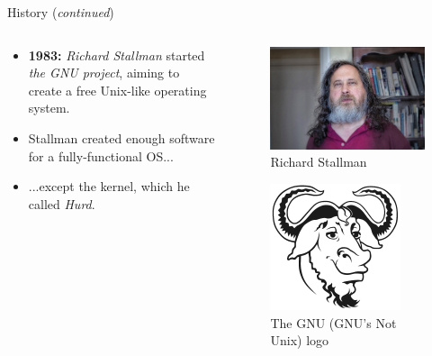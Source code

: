\documentclass[11pt]{beamer}
\begin{document}
\begin{frame}{History (\textit{continued})}
	\begin{columns}
		\begin{column}{0.5\textwidth}
			\begin{itemize}
				\item \textbf{1983:} \textit{Richard Stallman} started \textit{the GNU project}, aiming to create a free Unix-like operating system.
				\item Stallman created enough software for a fully-functional OS...
				\item ...except the kernel, which he called \textit{Hurd}.
			\end{itemize}
		\end{column}
		\begin{column}{0.5\textwidth}
			\vspace{-10mm}
			\begin{figure}
				\includegraphics[scale=0.25]{stallman.jpg}
				\caption{Richard Stallman}
			\end{figure}
			\vspace{-6mm}
			\begin{figure}
				\includegraphics[scale=0.5]{gnu-logo.png}
				\caption{The GNU (GNU's Not Unix) logo}
			\end{figure}
		\end{column}
	\end{columns}
\end{frame}
\end{document}
